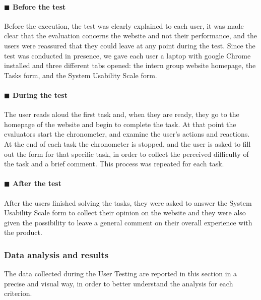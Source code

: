 \documentclass[11pt]{article} %
\begin{document}
\paragraph{$\blacksquare$ Before the test}
Before the execution, the test was clearly explained to each user, it was made clear that the evaluation concerns the website and not their performance, and the users were reassured that they could leave at any point during the test.
Since the test was conducted in presence, we gave each user a laptop with google Chrome installed and three different tabs opened: the intern group website homepage, the Tasks form, and the System Usability Scale form.

\paragraph{$\blacksquare$ During the test}
The user reads aloud the first task and, when they are ready, they go to the homepage of the website and begin to complete the task. At that point the evaluators start the chronometer, and examine the user’s actions and reactions. At the end of each task the chronometer is stopped, and the user is asked to fill out the form for that specific task, in order to collect the perceived difficulty of the task and a brief comment. This process was repeated for each task.

\paragraph{$\blacksquare$ After the test}
After the users finished solving the tasks, they were asked to answer the System Usability Scale form to collect their opinion on the website and they were also given the possibility to leave a general comment on their overall experience with the product.

\subsubsection{Data analysis and results}
The data collected during the User Testing are reported in this section in a precise and visual way, in order to better understand the analysis for each criterion.
\end{document}
